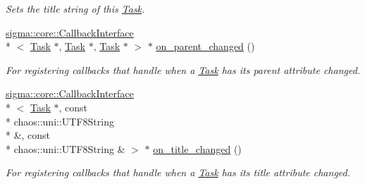 \begin{DoxyCompactItemize}
\begin{DoxyCompactList}\small\item\em Sets the title string of this \hyperlink{classsigma_1_1core_1_1tasks_1_1_task}{Task}. \end{DoxyCompactList}\item 
\hyperlink{classsigma_1_1core_1_1_callback_interface}{sigma\-::core\-::\-Callback\-Interface}\\*
$<$ \hyperlink{classsigma_1_1core_1_1tasks_1_1_task}{Task} $\ast$, \hyperlink{classsigma_1_1core_1_1tasks_1_1_task}{Task} $\ast$, \hyperlink{classsigma_1_1core_1_1tasks_1_1_task}{Task} $\ast$ $>$ $\ast$ \hyperlink{classsigma_1_1core_1_1tasks_1_1_task_a4947e26b1208f36cf4bab3f2091db786}{on\-\_\-parent\-\_\-changed} ()
\begin{DoxyCompactList}\small\item\em For registering callbacks that handle when a \hyperlink{classsigma_1_1core_1_1tasks_1_1_task}{Task} has its parent attribute changed. \end{DoxyCompactList}\item 
\hyperlink{classsigma_1_1core_1_1_callback_interface}{sigma\-::core\-::\-Callback\-Interface}\\*
$<$ \hyperlink{classsigma_1_1core_1_1tasks_1_1_task}{Task} $\ast$, const \\*
chaos\-::uni\-::\-U\-T\-F8\-String \\*
\&, const \\*
chaos\-::uni\-::\-U\-T\-F8\-String \& $>$ $\ast$ \hyperlink{classsigma_1_1core_1_1tasks_1_1_task_afb01222cabc945022f095921437a10a0}{on\-\_\-title\-\_\-changed} ()
\begin{DoxyCompactList}\small\item\em For registering callbacks that handle when a \hyperlink{classsigma_1_1core_1_1tasks_1_1_task}{Task} has its title attribute changed. \end{DoxyCompactList}\end{DoxyCompactItemize}

